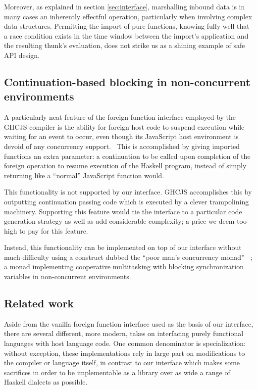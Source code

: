 \documentclass[preprint]{sigplanconf}
\begin{document}
Moreover, as explained in section \ref{sec:interface}, marshalling inbound
data is in many cases an inherently effectful operation, particularly when
involving complex data structures. Permitting the import of pure functions,
knowing fully well that a race condition exists in the time window between
the import's application and the resulting thunk's evaluation, does not strike
us as a shining example of safe API design.

\subsection{Continuation-based blocking in non-concurrent environments}
A particularly neat feature of the foreign function interface employed by the
GHCJS compiler is the ability for foreign host code to suspend execution while
waiting for an event to occur, even though its JavaScript host environment is
devoid of any concurrency support.\ \cite{ghcjs}
This is accomplished by giving imported functions an extra parameter:
a continuation to be called upon completion
of the foreign operation to resume execution of the Haskell program, instead
of simply returning like a ``normal'' JavaScript function would.

This functionality is not supported by our interface. GHCJS accomplishes this
by outputting continuation passing code which is executed by a clever
trampolining machinery. Supporting this feature would tie the interface to
a particular code generation strategy as well as add considerable complexity;
a price we deem too high to pay for this feature.

Instead, this functionality can be implemented on top of our interface without
much difficulty using a construct dubbed the ``poor man's concurrency monad''
\ \cite{poormansconcurrencymonad}; a monad implementing cooperative
multitasking with blocking synchronization variables in non-concurrent
environments.

\subsection{Related work}\label{sec:related}
Aside from the vanilla foreign function interface used as the basis of our
interface, there are several different, more modern, takes on interfacing
purely functional languages with host language code.
One common denominator is specialization: without exception, these
implementations rely in large part on modifications to the compiler or
language itself, in contrast to our interface which makes some sacrifices
in order to be implementable as a library over as wide a range of Haskell
dialects as possible.
\end{document}
